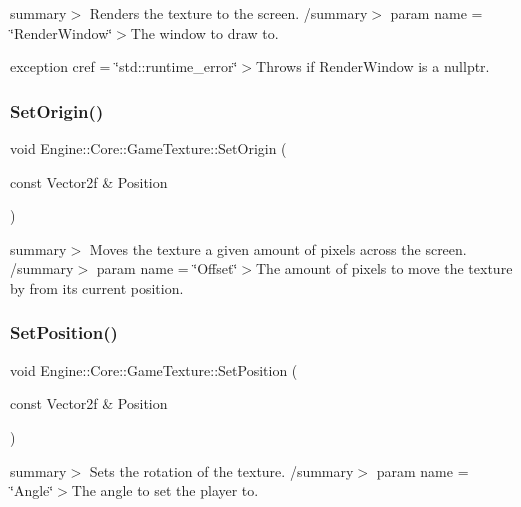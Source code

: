 summary$>$ Renders the texture to the screen. /summary$>$ param name = \char`\"{}\+Render\+Window\char`\"{}$>$The window to draw to.

exception cref = \char`\"{}std\+::runtime\+\_\+error\char`\"{}$>$Throws if Render\+Window is a nullptr.\mbox{\label{class_engine_1_1_core_1_1_game_texture_aa01df5d689abf48b1d442da329485eeb}} 
\subsubsection{\texorpdfstring{Set\+Origin()}{SetOrigin()}}
{\footnotesize\ttfamily void Engine\+::\+Core\+::\+Game\+Texture\+::\+Set\+Origin (\begin{DoxyParamCaption}\item[{const Vector2f \&}]{Position }\end{DoxyParamCaption})}

summary$>$ Moves the texture a given amount of pixels across the screen. /summary$>$ param name = \char`\"{}\+Offset\char`\"{}$>$The amount of pixels to move the texture by from its current position.\mbox{\label{class_engine_1_1_core_1_1_game_texture_ae1f94e0f1b86e99ed4508ccdda4872d6}} 
\subsubsection{\texorpdfstring{Set\+Position()}{SetPosition()}}
{\footnotesize\ttfamily void Engine\+::\+Core\+::\+Game\+Texture\+::\+Set\+Position (\begin{DoxyParamCaption}\item[{const Vector2f \&}]{Position }\end{DoxyParamCaption})}

summary$>$ Sets the rotation of the texture. /summary$>$ param name = \char`\"{}\+Angle\char`\"{}$>$The angle to set the player to.\mbox{\label{class_engine_1_1_core_1_1_game_texture_a5ed78714df6128f09c35c25e2271dc05}} 
